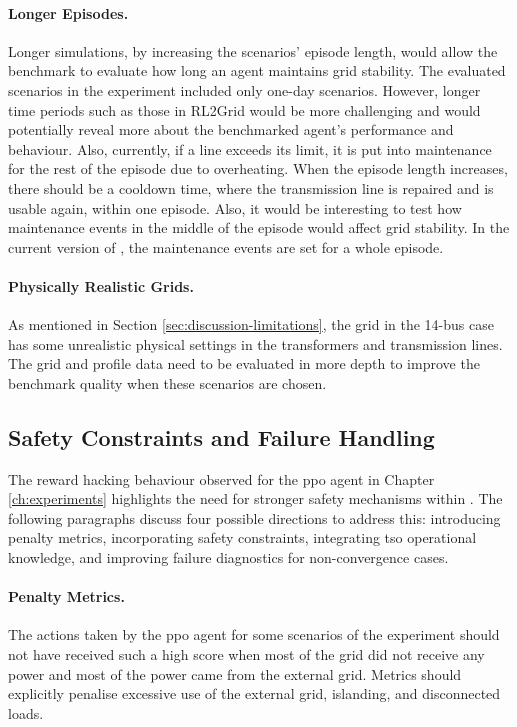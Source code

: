 \paragraph{Longer Episodes.}
Longer simulations, by increasing the scenarios' episode length, would allow the benchmark to evaluate how long an agent maintains grid stability. The evaluated scenarios in the experiment included only one-day scenarios. However, longer time periods such as those in RL2Grid would be more challenging and would potentially reveal more about the benchmarked agent's performance and behaviour. Also, currently, if a line exceeds its limit, it is put into maintenance for the rest of the episode due to overheating. When the episode length increases, there should be a cooldown time, where the transmission line is repaired and is usable again, within one episode. Also, it would be interesting to test how maintenance events in the middle of the episode would affect grid stability. In the current version of \benchmark, the maintenance events are set for a whole episode.

\paragraph{Physically Realistic Grids.}
As mentioned in Section \ref{sec:discussion-limitations}, the grid in the 14-bus case has some unrealistic physical settings in the transformers and transmission lines. The grid and profile data need to be evaluated in more depth to improve the benchmark quality when these scenarios are chosen.


\subsection{Safety Constraints and Failure Handling}\label{ssec:future-safety}
The reward hacking behaviour observed for the \ac{ppo} agent in Chapter \ref{ch:experiments} highlights the need for stronger safety mechanisms within \benchmark. The following paragraphs discuss four possible directions to address this: introducing penalty metrics, incorporating safety constraints, integrating \ac{tso} operational knowledge, and improving failure diagnostics for non-convergence cases.

\paragraph{Penalty Metrics.}
The actions taken by the \ac{ppo} agent for some scenarios of the experiment should not have received such a high score when most of the grid did not receive any power and most of the power came from the external grid. Metrics should explicitly penalise excessive use of the external grid, islanding, and disconnected loads.

